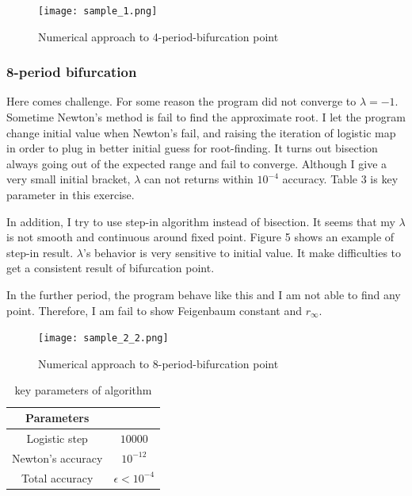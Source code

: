\documentclass[12pt]{article}
\begin{document}
\begin{figure}[h!]
	\begin{center}
		\texttt{[image: sample\_1.png]}
		\caption{Numerical approach to 4-period-bifurcation point}
		\label{fig2}
	\end{center}
\end{figure}

\subsubsection{8-period bifurcation}
Here comes challenge. For some reason the program did not converge to $\lambda=-1$. Sometime Newton's method is fail to find the approximate root. I let the program change initial value when Newton's fail, and raising the iteration of logistic map in order to plug in better initial guess for root-finding. It turns out bisection always going out of the expected range and fail to converge. Although I give a very small initial bracket, $\lambda$ can not returns within $10^{-4}$ accuracy. Table 3 is key parameter in this exercise. 

In addition, I try to use step-in algorithm instead of bisection. It seems that my $\lambda$ is not smooth and continuous around fixed point. Figure 5 shows an example of step-in result. $\lambda$'s behavior is very sensitive to initial value. It make difficulties to get a consistent result of bifurcation point.

In the further period, the program behave like this and I am not able to find any point. Therefore, I am fail to show Feigenbaum constant and $r_{\infty}$.

\begin{figure}[h!]
	\begin{center}
		\texttt{[image: sample\_2\_2.png]}
		\caption{Numerical approach to 8-period-bifurcation point}
		\label{fig2}
	\end{center}
\end{figure}



\begin{table}[h]
	\begin{center}
		\begin{tabular}{c|c}
			\hline
			Parameters & \\ 
			\hline
			Logistic step & $10000$ \\
			Newton's accuracy& $10^{-12}$\\
			Total accuracy&$\epsilon<10^{-4}$\\
			\hline
		\end{tabular}
	\end{center}
	\caption{key parameters of algorithm}
\end{table}
\end{document}
